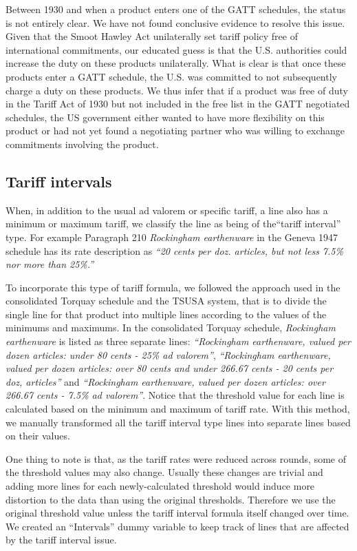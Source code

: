 \documentclass[
  12pt,
]{article}
\begin{document}
Between 1930 and when a product enters one of the GATT schedules, the status is not entirely clear. We have not found conclusive evidence to resolve this issue. Given that the Smoot Hawley Act unilaterally set tariff policy free of international commitments, our educated guess is that the U.S. authorities could increase the duty on these products unilaterally. What is clear is that once these products enter a GATT schedule, the U.S. was committed to not subsequently charge a duty on these products. We thus infer that if a product was free of duty in the Tariff Act of 1930 but not included in the free list in the GATT negotiated schedules, the US government either wanted to have more flexibility on this product or had not yet found a negotiating partner who was willing to exchange commitments involving the product.

\hypertarget{int}{%
\subsection{Tariff intervals}\label{int}}

When, in addition to the usual ad valorem or specific tariff, a line also has a minimum or maximum tariff, we classify the line as being of the``tariff interval'' type. For example Paragraph 210 \emph{Rockingham earthenware} in the Geneva 1947 schedule has its rate description as \emph{``20 cents per doz. articles, but not less 7.5\% nor more than 25\%.''}

To incorporate this type of tariff formula, we followed the approach used in the consolidated Torquay schedule and the TSUSA system, that is to divide the single line for that product into multiple lines according to the values of the minimums and maximums. In the consolidated Torquay schedule, \emph{Rockingham earthenware} is listed as three separate lines: \emph{``Rockingham earthenware, valued per dozen articles: under 80 cents - 25\% ad valorem''}, \emph{``Rockingham earthenware, valued per dozen articles: over 80 cents and under 266.67 cents - 20 cents per doz, articles''} and \emph{``Rockingham earthenware, valued per dozen articles: over 266.67 cents - 7.5\% ad valorem''}. Notice that the threshold value for each line is calculated based on the minimum and maximum of tariff rate. With this method, we manually transformed all the tariff interval type lines into separate lines based on their values.

One thing to note is that, as the tariff rates were reduced across rounds, some of the threshold values may also change. Usually these changes are trivial and adding more lines for each newly-calculated threshold would induce more distortion to the data than using the original thresholds. Therefore we use the original threshold value unless the tariff interval formula itself changed over time. We created an ``Intervals'' dummy variable to keep track of lines that are affected by the tariff interval issue.
\end{document}
